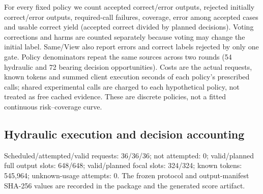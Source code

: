 \documentclass[11pt,a4paper]{article}
\begin{document}
For every fixed policy we count accepted correct/error outputs, rejected initially correct/error outputs, required-call failures, coverage, error among accepted cases and usable correct yield (accepted correct divided by planned decisions). Voting corrections and harms are counted separately because voting may change the initial label. Same/View also report errors and correct labels rejected by only one gate. Policy denominators repeat the same sources across two rounds (54 hydraulic and 72 bearing decision opportunities). Costs are the actual requests, known tokens and summed client execution seconds of each policy's prescribed calls; shared experimental calls are charged to each hypothetical policy, not treated as free cached evidence. These are discrete policies, not a fitted continuous risk--coverage curve.


\subsection{Hydraulic execution and decision accounting}

Scheduled/attempted/valid requests: 36/36/36; not attempted: 0; valid/planned full output slots: 648/648; valid/planned focal slots: 324/324; known tokens: 545,964; unknown-usage attempts: 0. The frozen protocol and output-manifest SHA-256 values are recorded in the package and the generated score artifact.
\end{document}
